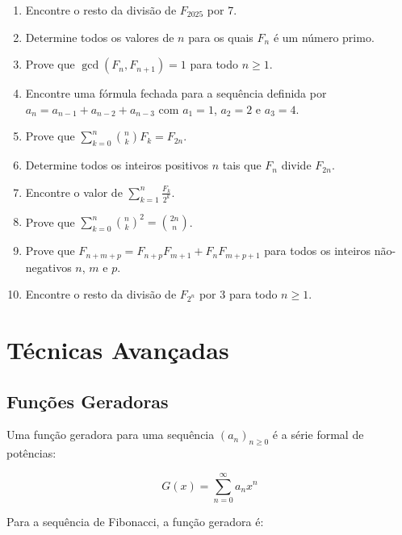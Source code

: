 \documentclass[12pt,a4paper]{article}
\begin{document}
\begin{enumerate}
    \item Encontre o resto da divisão de $F_{2025}$ por 7.
    
    \item Determine todos os valores de $n$ para os quais $F_n$ é um número primo.
    
    \item Prove que $\gcd(F_n, F_{n+1}) = 1$ para todo $n \geq 1$.
    
    \item Encontre uma fórmula fechada para a sequência definida por $a_n = a_{n-1} + a_{n-2} + a_{n-3}$ com $a_1 = 1$, $a_2 = 2$ e $a_3 = 4$.
    
    \item Prove que $\sum_{k=0}^{n} \binom{n}{k}F_k = F_{2n}$.
    
    \item Determine todos os inteiros positivos $n$ tais que $F_n$ divide $F_{2n}$.
    
    \item Encontre o valor de $\sum_{k=1}^{n} \frac{F_k}{2^k}$.
    
    \item Prove que $\sum_{k=0}^{n} \binom{n}{k}^2 = \binom{2n}{n}$.
    
    \item Prove que $F_{n+m+p} = F_{n+p}F_{m+1} + F_{n}F_{m+p+1}$ para todos os inteiros não-negativos $n$, $m$ e $p$.
    
    \item Encontre o resto da divisão de $F_{2^n}$ por 3 para todo $n \geq 1$.
\end{enumerate}

\section{Técnicas Avançadas}

\subsection{Funções Geradoras}

Uma função geradora para uma sequência $(a_n)_{n \geq 0}$ é a série formal de potências:

\begin{equation}
G(x) = \sum_{n=0}^{\infty} a_n x^n
\end{equation}

Para a sequência de Fibonacci, a função geradora é:
\end{document}
